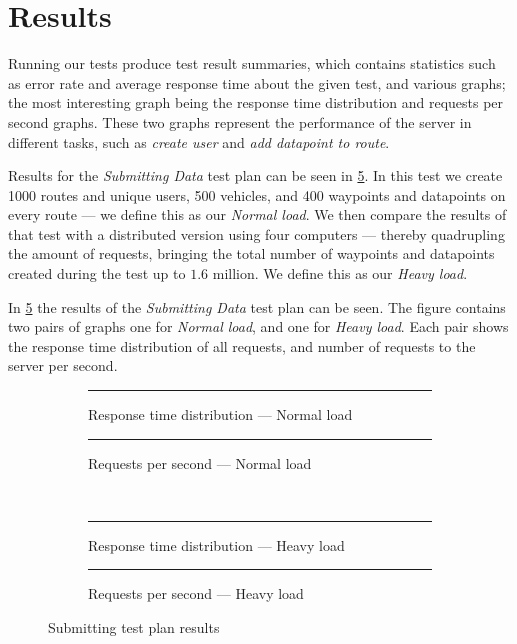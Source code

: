 \section{Results}
Running our tests produce test result summaries, which contains statistics such as error rate and average response time about the given test, and various graphs;
the most interesting graph being the response time distribution and requests per second graphs.
These two graphs represent the performance of the server in different tasks, such as \textit{create user} and \textit{add datapoint to route}.

Results for the \textit{Submitting Data} test plan can be seen in \cref{fig:submit_test_results}.
In this test we create 1000 routes and unique users, 500 vehicles, and 400 waypoints and datapoints on every route --- we define this as our \textit{Normal load}.
We then compare the results of that test with a distributed version using four computers --- thereby quadrupling the amount of requests, bringing the total number of waypoints and datapoints created during the test up to $1.6$ million.
We define this as our \textit{Heavy load}.

\bigskip
In \cref{fig:submit_test_results} the results of the \textit{Submitting Data} test plan can be seen.
The figure contains two pairs of graphs one for \textit{Normal load}, and one for \textit{Heavy load}.
Each pair shows the response time distribution of all requests, and number of requests to the server per second.

\begin{figure}[!htb]
    \centering
    \begin{subfigure}[b]{0.5\textwidth}
        \centering
        \rule{5cm}{5cm}
        \caption{Response time distribution --- Normal load}\label{fig:submit_resp_t_dist}
    \end{subfigure}\hfill%
    \begin{subfigure}[b]{0.5\textwidth}
        \centering
        \rule{5cm}{5cm}
        \caption{Requests per second --- Normal load}\label{fig:submit_reqs_p_sec}
    \end{subfigure}\\
    \begin{subfigure}[b]{0.5\textwidth}
        \centering
        \rule{5cm}{5cm}
        \caption{Response time distribution --- Heavy load}\label{fig:submit_resp_t_dist_heavy}
    \end{subfigure}\hfill%
    \begin{subfigure}[b]{0.5\textwidth}
        \centering
        \rule{5cm}{5cm}
        \caption{Requests per second --- Heavy load}\label{fig:submit_reqs_p_sec_heavy}
    \end{subfigure}
    \caption{Submitting test plan results}\label{fig:submit_test_results}
\end{figure}

